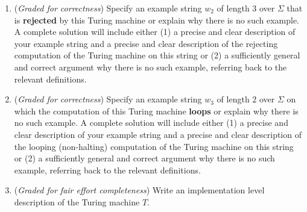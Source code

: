 \begin{enumerate}
\begin{enumerate}
        {\it Hint:} In class we've drawn pictures to represent the configuration of the machine at each step 
        in a computation.  You may do so or you may choose to describe these configurations in words.
        
        \item ({\it Graded for correctness}) Specify an example string $w_2$ of length $3$ over $\Sigma$ 
        that is {\bf rejected} by this Turing machine
        or explain why there is no such 
        example. A complete solution will include either (1) a precise and clear 
        description of your example  string and a precise and clear description of the rejecting computation
        of the Turing machine on this string or (2) a sufficiently
        general and correct argument why there is no such example, referring back to the relevant definitions.

        \item ({\it Graded for correctness}) Specify an example string $w_3$ of length $2$ over $\Sigma$ 
        on which  the computation of this Turing machine {\bf loops}
        or explain why there is no such 
        example. A complete solution will include either (1) a precise and clear 
        description of your example  string and a precise and clear description of the looping (non-halting) 
        computation
        of the Turing machine on this string or (2) a sufficiently
        general and correct argument why there is no such example, referring back to the relevant definitions.

        \item ({\it Graded for fair effort completeness}) Write an implementation level description of 
        the Turing machine $T$.
\end{enumerate}

\end{enumerate}
